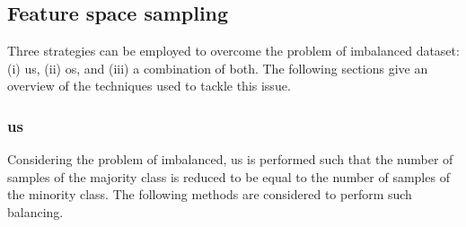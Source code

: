 \subsection{Feature space sampling}

Three strategies can be employed to overcome the problem of imbalanced dataset: (i) \ac{us}, (ii) \ac{os}, and (iii) a combination of both.
The following sections give an overview of the techniques used to tackle this issue.

\subsubsection{\acl{us}}

Considering the problem of imbalanced, \ac{us} is performed such that the number of samples of the majority class is reduced to be equal to the number of samples of the minority class.
The following methods are considered to perform such balancing.


